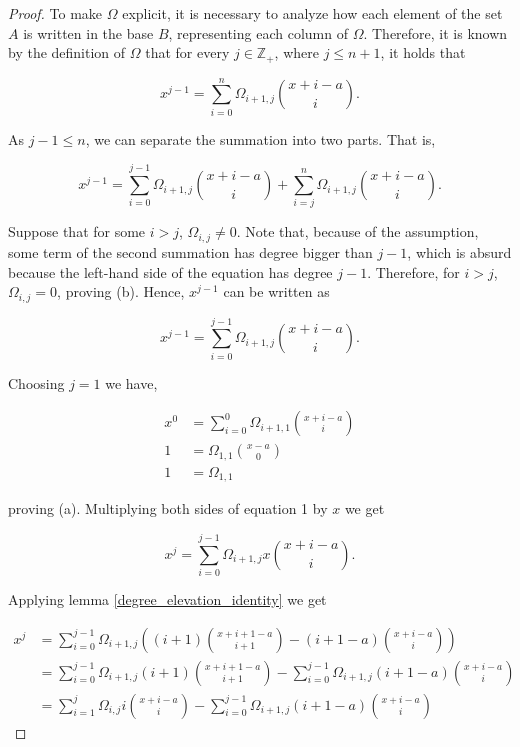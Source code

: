 \documentclass[12pt]{article}
\begin{document}
\begin{proof}

    To make $\Omega$ explicit, it is necessary to analyze how each element of the set $A$ is written in the base $B$, representing each column of $\Omega$. Therefore, it is known by the definition of $\Omega$ that for every $j \in \mathbb{Z_+}$, where $j \leq n+1$, it holds that

    $$
        x^{j-1} = \sum_{i = 0}^{n}\Omega_{i+1,j}\binom{x+i-a}{i}.
    $$

    As $j-1 \leq n$, we can separate the summation into two parts. That is,

    $$
        x^{j-1} = \sum_{i = 0}^{j-1}\Omega_{i+1,j}\binom{x+i-a}{i} + \sum_{i = j}^{n}\Omega_{i+1,j}\binom{x+i-a}{i}.
    $$

    Suppose that for some $i > j$, $\Omega_{i, j} \ne 0$. Note that, because of the assumption, some term of the second summation has degree bigger than $j-1$, which is absurd because the left-hand side of the equation has degree $j-1$. Therefore, for $i > j$, $\Omega_{i, j} = 0$, proving (b). Hence, $x^{j-1}$ can be written as

    \begin{equation}
        x^{j-1} = \sum_{i = 0}^{j-1}\Omega_{i+1,j}\binom{x+i-a}{i}.
    \end{equation}

    Choosing $j = 1$ we have,

    \begin{align*}
        x^0 & = \sum_{i = 0}^{0}\Omega_{i+1,1}\binom{x+i-a}{i} \\
        1   & = \Omega_{1,1}\binom{x-a}{0}                     \\
        1   & = \Omega_{1,1}
    \end{align*}

    proving (a). Multiplying both sides of equation 1 by $x$ we get

    $$
        x^j = \sum_{i = 0}^{j-1}\Omega_{i+1,j}x\binom{x+i-a}{i}.
    $$

    Applying lemma \ref{degree_elevation_identity} we get

    \begin{align*}
        x^j & = \sum_{i = 0}^{j-1}\Omega_{i+1,j} \left( (i+1)\binom{x+i+1-a}{i+1} - (i+1-a)\binom{x+i-a}{i} \right)                    \\
            & = \sum_{i = 0}^{j-1}\Omega_{i+1,j} (i+1)\binom{x+i+1-a}{i+1} - \sum_{i = 0}^{j-1} \Omega_{i+1,j} (i+1-a)\binom{x+i-a}{i} \\
            & = \sum_{i = 1}^{j}\Omega_{i,j} i \binom{x+i-a}{i} - \sum_{i = 0}^{j-1} \Omega_{i+1,j} (i+1-a) \binom{x+i-a}{i}
    \end{align*}


\end{proof}
\end{document}
